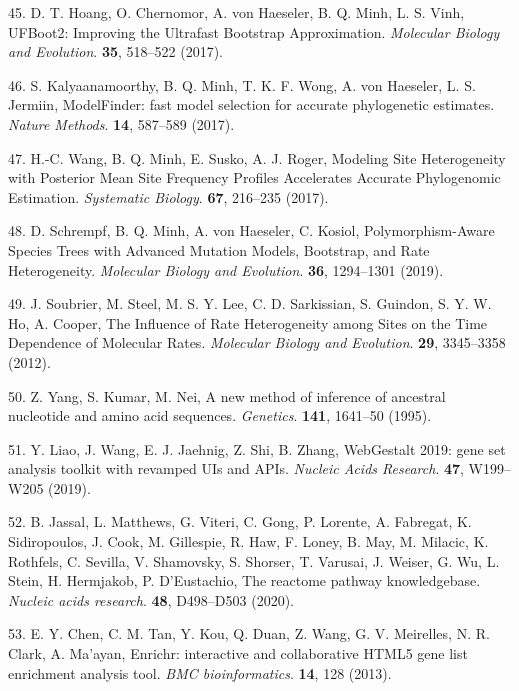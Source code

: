 \documentclass[]{elsarticle} %
\begin{document}
\leavevmode\hypertarget{ref-UFBoot2}{}%
45. D. T. Hoang, O. Chernomor, A. von Haeseler, B. Q. Minh, L. S. Vinh, UFBoot2: Improving the Ultrafast Bootstrap Approximation. \emph{Molecular Biology and Evolution}. \textbf{35}, 518--522 (2017).

\leavevmode\hypertarget{ref-ModelFinder}{}%
46. S. Kalyaanamoorthy, B. Q. Minh, T. K. F. Wong, A. von Haeseler, L. S. Jermiin, ModelFinder: fast model selection for accurate phylogenetic estimates. \emph{Nature Methods}. \textbf{14}, 587--589 (2017).

\leavevmode\hypertarget{ref-PMSF}{}%
47. H.-C. Wang, B. Q. Minh, E. Susko, A. J. Roger, Modeling Site Heterogeneity with Posterior Mean Site Frequency Profiles Accelerates Accurate Phylogenomic Estimation. \emph{Systematic Biology}. \textbf{67}, 216--235 (2017).

\leavevmode\hypertarget{ref-Schrempf2019}{}%
48. D. Schrempf, B. Q. Minh, A. von Haeseler, C. Kosiol, Polymorphism-Aware Species Trees with Advanced Mutation Models, Bootstrap, and Rate Heterogeneity. \emph{Molecular Biology and Evolution}. \textbf{36}, 1294--1301 (2019).

\leavevmode\hypertarget{ref-Soubrier2012}{}%
49. J. Soubrier, M. Steel, M. S. Y. Lee, C. D. Sarkissian, S. Guindon, S. Y. W. Ho, A. Cooper, The Influence of Rate Heterogeneity among Sites on the Time Dependence of Molecular Rates. \emph{Molecular Biology and Evolution}. \textbf{29}, 3345--3358 (2012).

\leavevmode\hypertarget{ref-Yang1995}{}%
50. Z. Yang, S. Kumar, M. Nei, A new method of inference of ancestral nucleotide and amino acid sequences. \emph{Genetics}. \textbf{141}, 1641--50 (1995).

\leavevmode\hypertarget{ref-WebGestalt2019}{}%
51. Y. Liao, J. Wang, E. J. Jaehnig, Z. Shi, B. Zhang, WebGestalt 2019: gene set analysis toolkit with revamped UIs and APIs. \emph{Nucleic Acids Research}. \textbf{47}, W199--W205 (2019).

\leavevmode\hypertarget{ref-Reactome}{}%
52. B. Jassal, L. Matthews, G. Viteri, C. Gong, P. Lorente, A. Fabregat, K. Sidiropoulos, J. Cook, M. Gillespie, R. Haw, F. Loney, B. May, M. Milacic, K. Rothfels, C. Sevilla, V. Shamovsky, S. Shorser, T. Varusai, J. Weiser, G. Wu, L. Stein, H. Hermjakob, P. D'Eustachio, The reactome pathway knowledgebase. \emph{Nucleic acids research}. \textbf{48}, D498--D503 (2020).

\leavevmode\hypertarget{ref-Chen2013}{}%
53. E. Y. Chen, C. M. Tan, Y. Kou, Q. Duan, Z. Wang, G. V. Meirelles, N. R. Clark, A. Ma'ayan, Enrichr: interactive and collaborative HTML5 gene list enrichment analysis tool. \emph{BMC bioinformatics}. \textbf{14}, 128 (2013).
\end{document}
